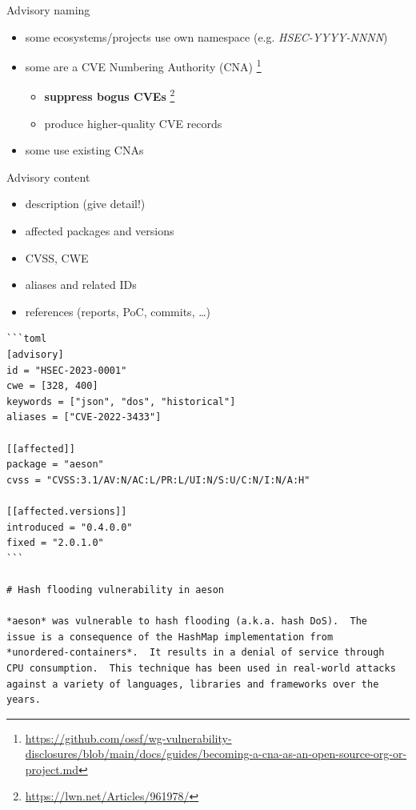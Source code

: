 \documentclass[ignorenonframetext,aspectratio=169,12pt]{beamer}
\begin{document}
\begin{frame}{Advisory naming}
  \begin{itemize}
    \item some ecosystems/projects use own namespace
      (e.g. {\em HSEC-YYYY-NNNN})
    \item some are a CVE Numbering Authority (CNA)
        \footnote{\url{https://github.com/ossf/wg-vulnerability-disclosures/blob/main/docs/guides/becoming-a-cna-as-an-open-source-org-or-project.md}}
      \begin{itemize}
        \item {\bf suppress bogus CVEs}
          \footnote{\url{https://lwn.net/Articles/961978/}}
        \item produce higher-quality CVE records
      \end{itemize}
    \item some use existing CNAs
  \end{itemize}
\end{frame}

\begin{frame}{Advisory content}
  \begin{itemize}
    \item description (give detail!)
    \item affected packages and versions
    \item CVSS, CWE
    \item aliases and related IDs
    \item references (reports, PoC, commits, \ldots{})
  \end{itemize}
\end{frame}


\begin{frame}[fragile]
\scriptsize
\begin{verbatim}
```toml
[advisory]
id = "HSEC-2023-0001"
cwe = [328, 400]
keywords = ["json", "dos", "historical"]
aliases = ["CVE-2022-3433"]

[[affected]]
package = "aeson"
cvss = "CVSS:3.1/AV:N/AC:L/PR:L/UI:N/S:U/C:N/I:N/A:H"

[[affected.versions]]
introduced = "0.4.0.0"
fixed = "2.0.1.0"
```

# Hash flooding vulnerability in aeson

*aeson* was vulnerable to hash flooding (a.k.a. hash DoS).  The
issue is a consequence of the HashMap implementation from
*unordered-containers*.  It results in a denial of service through
CPU consumption.  This technique has been used in real-world attacks
against a variety of languages, libraries and frameworks over the
years.

\end{verbatim}
\end{frame}
\end{document}
